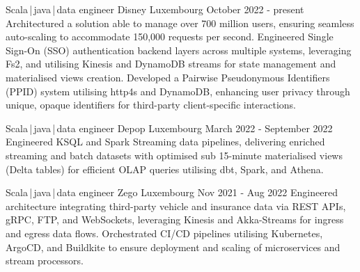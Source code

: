 
\newcommand*{\logo}[2]{\raisebox{-0.2em}{\texttt{[image: \#2]}}\hspace{0.25em}#1}
\newcommand*{\logoonly}[1]{\raisebox{-0.2em}{\texttt{[image: \#1]}}}


\begin{cventries}
  \cventry
    {Scala\,|\,java\,|\,data engineer}
    {\logo{Disney}{../../../images/disney.png}} %
    {Luxembourg} %
    {October 2022 - present} %
    {
      Architectured a solution able to manage over 700 million users, ensuring seamless auto-scaling to accommodate 150,000 requests per second. Engineered Single Sign-On (SSO) authentication backend layers across multiple systems, leveraging Fs2, and utilising Kinesis and DynamoDB streams for state management and materialised views creation. 
      \newline
      Developed a Pairwise Pseudonymous Identifiers (PPID) system utilising http4s and DynamoDB, enhancing user privacy through unique, opaque identifiers for third-party client-specific interactions.
    }

  \cventry
    {Scala\,|\,java\,|\,data engineer}
    {\logo{Depop}{../../../images/depop.jpg}} %
    {Luxembourg} %
    {March 2022 - September 2022} %
    {
       Engineered KSQL and Spark Streaming data pipelines, delivering enriched streaming and batch datasets with optimised sub 15-minute materialised views (Delta tables) for efficient OLAP queries utilising dbt, Spark, and Athena.
    }


  \cventry
    {Scala\,|\,java\,|\,data engineer}
    {\logo{Zego}{../../../images/zego.jpg}} %
    {Luxembourg} %
    {Nov 2021 - Aug 2022} %
    {
     Engineered architecture integrating third-party vehicle and insurance data via REST APIs, gRPC, FTP, and WebSockets, leveraging Kinesis and Akka-Streams for ingress and egress data flows. Orchestrated CI/CD pipelines utilising Kubernetes, ArgoCD, and Buildkite to ensure deployment and scaling of microservices and stream processors.
    }


\end{cventries}
